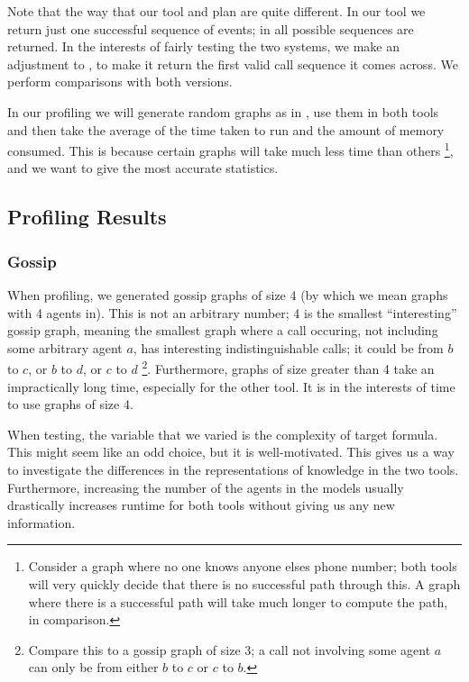 \documentclass[10pt, a4paper]{report}
\begin{document}
Note that the way that our tool and \cite{GithubGossip} plan are quite
different. In our tool we return just one successful sequence of events; in
\cite{GithubGossip} all possible sequences are returned. In the interests of
fairly testing the two systems, we make an adjustment to \cite{GithubGossip}, to
make it return the first valid call sequence it comes across. We perform
comparisons with both versions.

In our profiling we will generate random graphs as in
, use them in both tools and then take the average
of the time taken to run and the amount of memory consumed. This is because
certain graphs will take much less time than others \footnote{Consider a graph
  where no one knows anyone elses phone number; both tools will very quickly
  decide that there is no successful path through this. A graph where there is a
  successful path will take much longer to compute the path, in comparison.},
and we want to give the most accurate statistics.

\subsection{Profiling Results}

\subsubsection{Gossip}

When profiling, we generated gossip graphs of size 4 (by which we mean graphs
with 4 agents in). This is not an arbitrary number; 4 is the smallest
``interesting'' gossip graph, meaning the smallest graph where a call occuring,
not including some arbitrary agent $a$, has interesting indistinguishable calls;
it could be from $b$ to $c$, or $b$ to $d$, or $c$ to $d$ \footnote{Compare this
  to a gossip graph of size 3; a call not involving some agent $a$ can only be
  from either $b$ to $c$ or $c$ to $b$.}. Furthermore, graphs of size greater
than 4 take an impractically long time, especially for the other tool. It is in
the interests of time to use graphs of size 4.

When testing, the variable that we varied is the complexity of target formula.
This might seem like an odd choice, but it is well-motivated. This gives us
a way to investigate the differences in the representations of knowledge in the
two tools. Furthermore, increasing the number of the agents in the models
usually drastically increases runtime for both tools without giving us any new
information.
\end{document}
